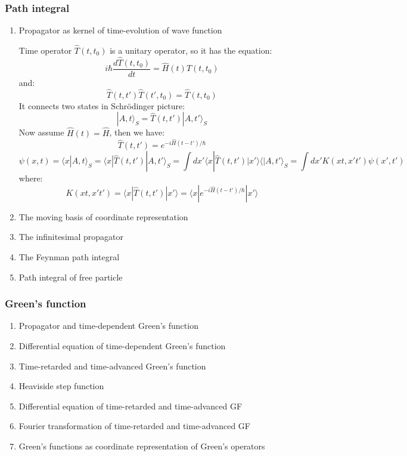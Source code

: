 \documentclass[12pt]{article}
\numberwithin{equation}{section}
\begin{document}
\subsubsection{Path integral}
\begin{enumerate}
\item Propagator as kernel of time-evolution of wave function \par
	Time operator $\hat{T}(t, t_0)$ is a unitary operator, so it has the equation:
	\begin{equation}
		i\hbar\frac{d\hat{T}(t, t_0)}{dt}=\hat{H}(t)\hat{T}(t,t_0)
	\end{equation}
	and:
	\begin{equation}
		\hat{T}(t, t')\hat{T}(t', t_0)=\hat{T}(t, t_0)
	\end{equation}
	It connects two states in Schr\"{o}dinger picture:
	\begin{equation}
		|A,t\rangle_S=\hat{T}(t, t')|A,t'\rangle_S
	\end{equation}
	Now assume $\hat{H}(t)=\hat{H}$, then we have:
	\begin{equation}
		\hat{T}(t, t')=e^{-i\hat{H}(t-t')/\hbar}
	\end{equation}
	\begin{equation}
		\psi(x,t)=\langle x|A, t\rangle_S=\langle x|\hat{T}(t, t')|A,t'\rangle_S
		=\int dx'\langle x|\hat{T}(t, t')|x'\rangle \langle|A,t'\rangle_S
		=\int dx'K(xt,x't')\psi(x',t')
	\end{equation}
	where:
	\begin{equation}
		K(xt,x't') = \langle x|\hat{T}(t, t')|x'\rangle =\langle x| e^{-i\hat{H}(t-t')/\hbar} |x'\rangle
	\end{equation}
\item The moving basis of coordinate representation

\item The infinitesimal propagator
\item The Feynman path integral
\item Path integral of free particle
\end{enumerate}
\subsubsection{Green's function}
\begin{enumerate}
\item Propagator and time-dependent Green's function
\item Differential equation of time-dependent Green's function
\item Time-retarded and time-advanced Green's function
\item Heaviside step function
\item Differential equation of time-retarded and time-advanced GF
\item Fourier transformation of time-retarded and time-advanced GF
\item Green's functions as coordinate representation of Green's operators
\end{enumerate}
\end{document}

